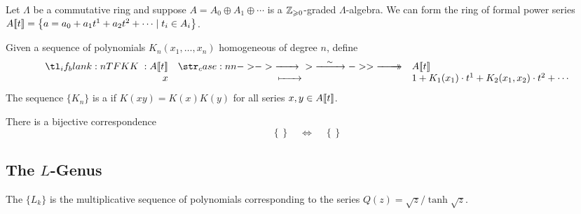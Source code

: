 Let $\Lambda$ be a commutative ring and suppose $A=A_0\oplus A_1\oplus\cdots$ is a $\mathbb{Z}_{\geqslant 0}$-graded $\Lambda$-algebra. We can form the ring of formal power series $A[\![t]\!] = \left\{ a =a_0+ a_1 t^1+ a_2 t^2+\cdots \mid t_i\in A_i\right\}$.

\begin{definition}
	Given a sequence of polynomials $K_n(x_1, \ldots, x_n)$ homogeneous of degree $n$, define
	\[
		\lkxfunc{K}{A\fps{t}}{A\fps{t}}{x}{1+K_1(x_1)\cdot t^1+K_2(x_1,x_2)\cdot t^2+\cdots}
	\]
	The sequence $\{K_n\}$ is a  if $K(xy)=K(x)K(y)$ for all series $x,y\in A[\![t]\!]$.
\end{definition}

\begin{proposition}
	There is a bijective correspondence
	\[
		\left\{\right\}
		\quad\iff\quad
		\left\{\right\}
	\]
\end{proposition}

\subsection*{The $L$-Genus}

\begin{definition}
	The  $\{L_k\}$ is the multiplicative sequence of polynomials corresponding to the series $Q(z) = \sqrt{z}/\tanh\sqrt{z}$.
\end{definition}

